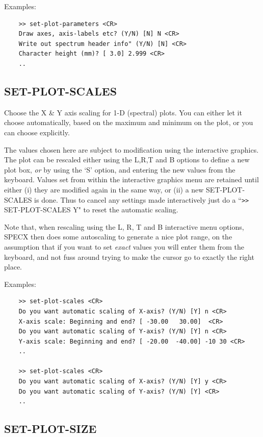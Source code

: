 \documentclass[11pt,twoside]{report}
\begin{document}
Examples:
\begin{verbatim}
    >> set-plot-parameters <CR>
    Draw axes, axis-labels etc? (Y/N) [N] N <CR>
    Write out spectrum header info" (Y/N) [N] <CR>
    Character height (mm)? [ 3.0] 2.999 <CR>
    ..
\end{verbatim}

\subsection{SET-PLOT-SCALES} 

Choose the X \& Y axis scaling for 1-D (spectral) plots. You can either
let it choose automatically, based on the maximum and minimum on the plot,
or you can choose explicitly.

The values chosen here are subject to modification using the interactive
graphics.  The plot can be rescaled either using
the L,R,T and B options to define a new plot box, {\em or} by using the `S'
option, and entering the new values from the keyboard. Values set from within
the interactive graphics menu are retained until either (i) they are modified
again in the same way, or (ii) a new SET-PLOT-SCALES is done. Thus to cancel
any settings made interactively just do a ``\verb+>>+ SET-PLOT-SCALES Y" to reset the
automatic scaling.

Note that, when rescaling using the L, R, T and B interactive menu options,
SPECX then does some autoscaling to generate a nice plot range, on the
assumption that if you want to set {\em exact} values you will enter them
from the keyboard, and not fuss around trying to make the cursor go to 
exactly the right place.

Examples:
\begin{verbatim}
    >> set-plot-scales <CR>
    Do you want automatic scaling of X-axis? (Y/N) [Y] n <CR>
    X-axis scale: Beginning and end? [ -30.00   30.00]  <CR>
    Do you want automatic scaling of Y-axis? (Y/N) [Y] n <CR>
    Y-axis scale: Beginning and end? [ -20.00  -40.00] -10 30 <CR>
    ..

    >> set-plot-scales <CR>
    Do you want automatic scaling of X-axis? (Y/N) [Y] y <CR>
    Do you want automatic scaling of Y-axis? (Y/N) [Y] <CR>
    ..
\end{verbatim}


\subsection{SET-PLOT-SIZE} 
\end{document}
